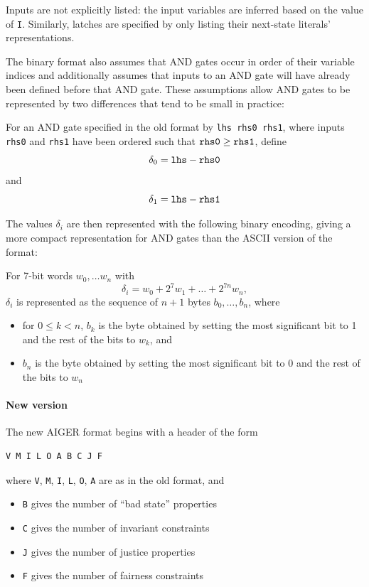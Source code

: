 \documentclass[12pt,a4paper,twoside,openright]{report}
\begin{document}
{{Inputs are not explicitly listed: the input variables are inferred based on
the value of \verb,I,.
Similarly, latches are specified by only listing their next-state literals'
representations.

The binary format also assumes that AND gates occur in order of their
variable indices and additionally assumes that inputs to an AND gate will
have already been defined before that AND gate.
These assumptions allow AND gates to be represented by two differences
that tend to be small in practice:

For an AND gate specified in the old format by \verb,lhs rhs0 rhs1,,
where inputs \verb,rhs0, and \verb,rhs1, have been ordered such that
$\verb,rhs0, \geq \verb,rhs1,$, define
$$\delta_0 = \verb,lhs, - \verb,rhs0,$$
and
$$\delta_1 = \verb,lhs, - \verb,rhs1,$$

The values $\delta_i$ are then represented with the following binary
encoding, giving a more compact representation for AND gates than
the ASCII version of the format:

For 7-bit words $w_0, \ldots w_n$ with
$$\delta_i = w_0 + 2^7w_1 + \ldots + 2^{7n}w_n,$$
$\delta_i$ is represented as the sequence of $n + 1$ bytes
$b_0, \ldots, b_n$, where
\begin{itemize}
\item for $0 \leq k < n$, $b_k$ is the byte obtained by setting the most
significant bit to 1 and the rest of the bits to $w_k$, and
\item $b_n$ is the byte obtained by setting the most
significant bit to 0 and the rest of the bits to $w_n$
\end{itemize}}


\paragraph{New version} {
The new AIGER format begins with a header of the form
\begin{verbatim}
V M I L O A B C J F
\end{verbatim}
where \verb,V,, \verb,M,, \verb,I,, \verb,L,, \verb,O,, \verb,A, are as
in the old format, and
\begin{itemize}
\item \verb,B, gives the number of ``bad state'' properties
\item \verb,C, gives the number of invariant constraints
\item \verb,J, gives the number of justice properties
\item \verb,F, gives the number of fairness constraints
\end{itemize}

}}
\end{document}
